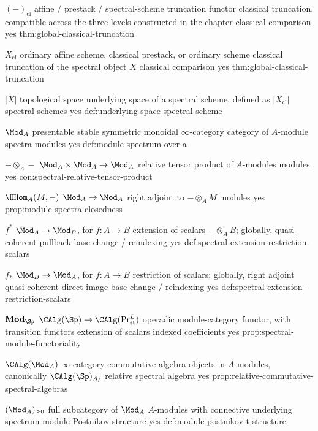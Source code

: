 \begin{longtable}
\CanonicalEntry
{\((-)_{\mathrm{cl}}\)}
{affine / prestack / spectral-scheme truncation functor}
{classical truncation, compatible across the three levels constructed in the chapter}
{classical comparison}
{yes}
{thm:global-classical-truncation}

\CanonicalEntry
{\(X_{\mathrm{cl}}\)}
{ordinary affine scheme, classical prestack, or ordinary scheme}
{classical truncation of the spectral object \(X\)}
{classical comparison}
{yes}
{thm:global-classical-truncation}

\CanonicalEntry
{\(|X|\)}
{topological space}
{underlying space of a spectral scheme, defined as \(|X_{\mathrm{cl}}|\)}
{spectral schemes}
{yes}
{def:underlying-space-spectral-scheme}

\CanonicalEntry
{\(\Mod_A\)}
{presentable stable symmetric monoidal \(\infty\)-category}
{category of \(A\)-module spectra}
{modules}
{yes}
{def:module-spectrum-over-a}

\CanonicalEntry
{\(-\otimes_A-\)}
{\(\Mod_A\times\Mod_A\to\Mod_A\)}
{relative tensor product of \(A\)-modules}
{modules}
{yes}
{con:spectral-relative-tensor-product}

\CanonicalEntry
{\(\HHom_A(M,-)\)}
{\(\Mod_A\to\Mod_A\)}
{right adjoint to \(-\otimes_A M\)}
{modules}
{yes}
{prop:module-spectra-closedness}

\CanonicalEntry
{\(f^*\)}
{\(\Mod_A\to\Mod_B\), for \(f:A\to B\)}
{extension of scalars \(-\otimes_A B\); globally, quasi-coherent pullback}
{base change / reindexing}
{yes}
{def:spectral-extension-restriction-scalars}

\CanonicalEntry
{\(f_*\)}
{\(\Mod_B\to\Mod_A\), for \(f:A\to B\)}
{restriction of scalars; globally, right adjoint quasi-coherent direct image}
{base change / reindexing}
{yes}
{def:spectral-extension-restriction-scalars}

\CanonicalEntry
{\(\mathbf{Mod}_{\Sp}\)}
{\(\CAlg(\Sp)\to\CAlg(\Pr^L_{\mathrm{st}})\)}
{operadic module-category functor, with transition functors extension of scalars}
{indexed coefficients}
{yes}
{prop:spectral-module-functoriality}

\CanonicalEntry
{\(\CAlg(\Mod_A)\)}
{\(\infty\)-category}
{commutative algebra objects in \(A\)-modules, canonically \(\CAlg(\Sp)_{A/}\)}
{relative spectral algebra}
{yes}
{prop:relative-commutative-spectral-algebras}

\CanonicalEntry
{\((\Mod_A)_{\geq0}\)}
{full subcategory of \(\Mod_A\)}
{\(A\)-modules with connective underlying spectrum}
{module Postnikov structure}
{yes}
{def:module-postnikov-t-structure}


\end{longtable}
